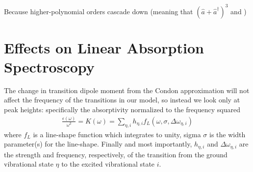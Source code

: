 Because higher-polynomial orders cascade down (meaning that $\left( \hat{a} + \hat{a}^{\dagger}\right)^3$ and )

\section{Effects on Linear Absorption Spectroscopy}
The change in transition dipole moment from the Condon approximation will not affect the frequency of the transitions in our model, so instead we look only at peak heights: specifically the absorptivity normalized to the frequency squared
\begin{align}
	\frac{\epsilon(\omega) }{\omega^2} = K(\omega) = \sum_{\eta,i} h_{\eta,i} f_{L} (\omega, \sigma, \Delta\omega_{\eta,i})
	\label{eqn:KDef}
\end{align}
where $f_{L}$ is a line-shape function which integrates to unity, sigma $\sigma$ is the width parameter(s) for the line-shape.  Finally and most importantly, $h_{\eta,i}$ and $\Delta\omega_{\eta,i}$ are the strength and frequency, respectively, of the transition from the ground vibrational state $\eta$ to the excited vibrational state $i$.


